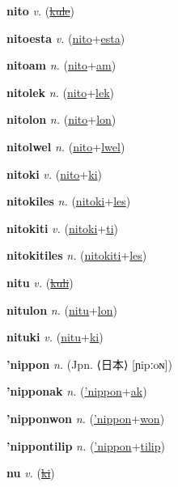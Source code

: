 \textbf{\hypertarget{nito}{nito}} \textit{v.} (\hyperlink{kule}{\sout{kule}})


\textbf{\hypertarget{nitoesta}{nitoesta}} \textit{v.} (\hyperlink{nito}{nito}+\allowbreak \hyperlink{esta}{esta})


\textbf{\hypertarget{nitoam}{nitoam}} \textit{n.} (\hyperlink{nito}{nito}+\allowbreak \hyperlink{am}{am})


\textbf{\hypertarget{nitolek}{nitolek}} \textit{n.} (\hyperlink{nito}{nito}+\allowbreak \hyperlink{lek}{lek})


\textbf{\hypertarget{nitolon}{nitolon}} \textit{n.} (\hyperlink{nito}{nito}+\allowbreak \hyperlink{lon}{lon})


\textbf{\hypertarget{nitolwel}{nitolwel}} \textit{n.} (\hyperlink{nito}{nito}+\allowbreak \hyperlink{lwel}{lwel})


\textbf{\hypertarget{nitoki}{nitoki}} \textit{v.} (\hyperlink{nito}{nito}+\allowbreak \hyperlink{ki}{ki})


\textbf{\hypertarget{nitokiles}{nitokiles}} \textit{n.} (\hyperlink{nitoki}{nitoki}+\allowbreak \hyperlink{les}{les})


\textbf{\hypertarget{nitokiti}{nitokiti}} \textit{v.} (\hyperlink{nitoki}{nitoki}+\allowbreak \hyperlink{ti}{ti})


\textbf{\hypertarget{nitokitiles}{nitokitiles}} \textit{n.} (\hyperlink{nitokiti}{nitokiti}+\allowbreak \hyperlink{les}{les})


\textbf{\hypertarget{nitu}{nitu}} \textit{v.} (\hyperlink{kuli}{\sout{kuli}})


\textbf{\hypertarget{nitulon}{nitulon}} \textit{n.} (\hyperlink{nitu}{nitu}+\allowbreak \hyperlink{lon}{lon})


\textbf{\hypertarget{nituki}{nituki}} \textit{v.} (\hyperlink{nitu}{nitu}+\allowbreak \hyperlink{ki}{ki})


\textbf{\hypertarget{'nippon}{'nippon}} \textit{n.} (Jpn. ⟨{\japanese{}日本}⟩ [ɲipːoɴ])


\textbf{\hypertarget{'nipponak}{'nipponak}} \textit{n.} (\hyperlink{'nippon}{'nippon}+\allowbreak \hyperlink{ak}{ak})


\textbf{\hypertarget{'nipponwon}{'nipponwon}} \textit{n.} (\hyperlink{'nippon}{'nippon}+\allowbreak \hyperlink{won}{won})


\textbf{\hypertarget{'nippontilip}{'nippontilip}} \textit{n.} (\hyperlink{'nippon}{'nippon}+\allowbreak \hyperlink{tilip}{tilip})


\textbf{\hypertarget{nu}{nu}} \textit{v.} (\hyperlink{ki}{\sout{ki}})


